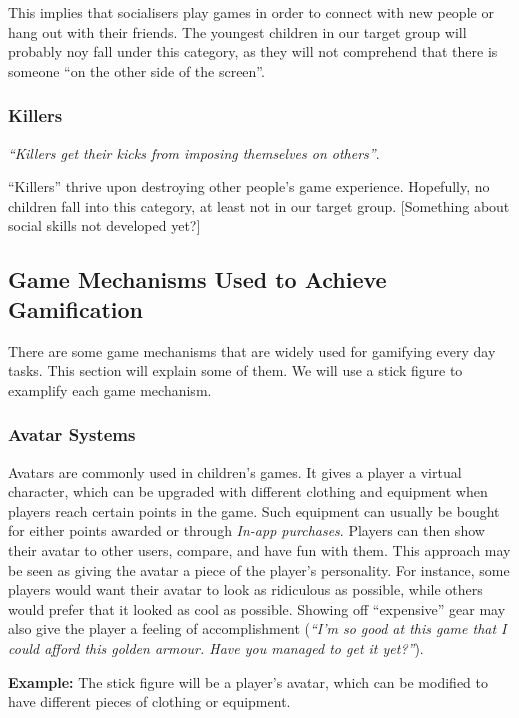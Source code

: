 This implies that socialisers play games in order to connect with new people or hang out with their friends. The youngest children in our target group will probably noy fall under this category, as they will not comprehend that there is someone ``on the other side of the screen''.    

\subsubsection{Killers}
\label{sec:killers}
\textit{``Killers get their kicks from imposing themselves on others''}\cite{bartle-gamers}.

``Killers'' thrive upon destroying other people's game experience. Hopefully, no children fall into this category, at least not in our target group. [Something about social skills not developed yet?] 

\subsection{Game Mechanisms Used to Achieve Gamification} 
\label{sec:gamemechanismsusedtoachievegamification}
There are some game mechanisms that are widely used for gamifying every day tasks. This section will explain some of them. We will use a stick figure to examplify each game mechanism. 

\subsubsection{Avatar Systems}
\label{sec:avatarsystems}
Avatars are commonly used in children's games. It gives a player a virtual character, which can be upgraded with different clothing and equipment when players reach certain points in the game. Such equipment can usually be bought for either points awarded or through \emph{In-app purchases}. Players can then show their avatar to other users, compare, and have fun with them. This approach may be seen as giving the avatar a piece of the player's personality. For instance, some players would want their avatar to look as ridiculous as possible, while others would prefer that it looked as cool as possible. Showing off ``expensive'' gear may also give the player a feeling of accomplishment (\emph{``I'm so good at this game that I could afford this golden armour. Have you managed to get it yet?''}). 

\textbf{Example:} The stick figure will be a player's avatar, which can be modified to have different pieces of clothing or equipment.  

